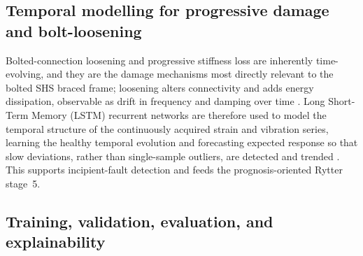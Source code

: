 \subsection{Temporal modelling for progressive damage and bolt-loosening}\label{subsec:temporal}

Bolted-connection loosening and progressive stiffness loss are inherently time-evolving, and they are the damage mechanisms most directly relevant to the bolted SHS braced frame; loosening alters connectivity and adds energy dissipation, observable as drift in frequency and damping over time \citep{farrar2013shm}. Long Short-Term Memory (LSTM) recurrent networks are therefore used to model the temporal structure of the continuously acquired strain and vibration series, learning the healthy temporal evolution and forecasting expected response so that slow deviations, rather than single-sample outliers, are detected and trended \citep{brunton2019data,naser2023ml}. This supports incipient-fault detection and feeds the prognosis-oriented Rytter stage~5.

\subsection{Training, validation, evaluation, and explainability}\label{subsec:training}

